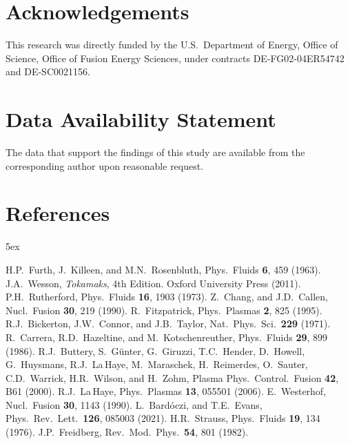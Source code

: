\documentclass[12pt,prb,aps]{revtex4-1}
\begin{document}
\section*{Acknowledgements}
This research was directly funded by the U.S.\ Department of Energy, Office of Science, Office of Fusion Energy Sciences,  under  contracts DE-FG02-04ER54742 and DE-SC0021156. 

\section*{Data Availability Statement}
The data that support the findings of this study are available from the corresponding author upon reasonable request.

\section*{References}
\begin{thebibliography}{99}\baselineskip 5ex

 H.P.~Furth, J.~Killeen, and M.N.~Rosenbluth, Phys.\ Fluids {\bf 6}, 459 (1963).
 J.A.~Wesson, {\em Tokamaks}, 4th Edition. Oxford University Press (2011).
 P.H.~Rutherford,  Phys.\ Fluids {\bf 16}, 1903 (1973).
 Z.~Chang, and J.D.~Callen, Nucl.\ Fusion {\bf 30}, 219 (1990).
 R.~Fitzpatrick, Phys.\ Plasmas {\bf 2}, 825 (1995).
 R.J.~Bickerton, J.W.~Connor, and J.B.~Taylor, Nat.\ Phys.\ Sci.\ {\bf 229} (1971).
 R.~Carrera, R.D.~Hazeltine, and M.~Kotschenreuther, Phys.\ Fluids {\bf 29},
899 (1986). 
 R.J.~Buttery, S.~G\"{u}nter, G.~Giruzzi, T.C.~Hender, D.~Howell,
G.~Huysmans, R.J.~La\,Haye, M.~Maraschek, H.~Reimerdes, O.~Sauter,
C.D.~Warrick, H.R.~Wilson, and H.~Zohm, Plasma Phys.\ Control.\ Fusion
{\bf 42}, B61 (2000). 
 R.J.~La\,Haye, Phys.\ Plasmas {\bf 13}, 055501 (2006). 
 E.~Westerhof, Nucl.\ Fusion {\bf 30}, 1143 (1990). 
 L.~Bard\'{o}czi, and T.E.~Evans, Phys.\ Rev.\ Lett.\ {\bf 126}, 085003 (2021).
 H.R.~Strauss, Phys.\  Fluids {\bf 19}, 134 (1976). 
 J.P.~Freidberg, Rev.\ Mod.\ Phys.\ {\bf 54}, 801 (1982). 

\end{thebibliography}
\end{document}
